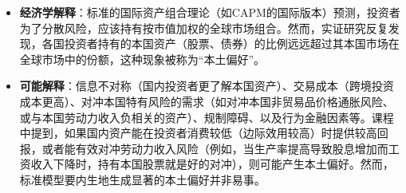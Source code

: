 \documentclass[12pt]{article}
\begin{document}
\begin{itemize}
\begin{itemize}
        \item \textbf{经济学解释}：标准的国际资产组合理论（如CAPM的国际版本）预测，投资者为了分散风险，应该持有按市值加权的全球市场组合。然而，实证研究反复发现，各国投资者持有的本国资产（股票、债券）的比例远远超过其本国市场在全球市场中的份额，这种现象被称为“本土偏好”。
        \item \textbf{可能解释}：信息不对称（国内投资者更了解本国资产）、交易成本（跨境投资成本更高）、对冲本国特有风险的需求（如对冲本国非贸易品价格通胀风险、或与本国劳动力收入负相关的资产）、规制障碍、以及行为金融因素等。课程中提到，如果国内资产能在投资者消费较低（边际效用较高）时提供较高回报，或者能有效对冲劳动力收入风险（例如，当生产率提高导致股息增加而工资收入下降时，持有本国股票就是好的对冲），则可能产生本土偏好。然而，标准模型要内生地生成显著的本土偏好并非易事。
    \end{itemize}
\end{itemize}
\end{document}
